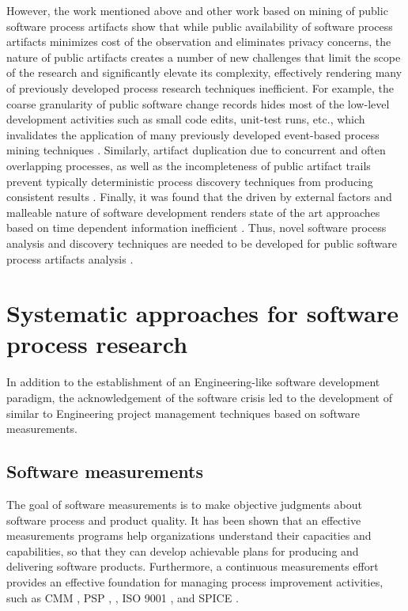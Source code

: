 However, the work mentioned above and other work based on mining of public software process artifacts show 
that while public availability of software process artifacts minimizes cost of the observation and eliminates privacy concerns, 
the nature of public artifacts creates a number of new challenges that limit the scope of the research and 
significantly elevate its complexity, effectively rendering many of previously developed process research techniques inefficient. 
For example, the coarse granularity of public software change records hides most of the low-level development activities
such as small code edits, unit-test runs, etc., which invalidates the application of many previously developed event-based 
process mining techniques \cite{citeulike:10377366} \cite{citeulike:2678511}.
Similarly, artifact duplication due to concurrent and often overlapping processes, as well as the incompleteness of 
public artifact trails prevent typically deterministic process discovery techniques from producing consistent 
results \cite{citeulike:2678511} \cite{citeulike:7770568}. 
Finally, it was found that the driven by external factors and malleable nature of software development renders 
state of the art approaches based on time dependent information inefficient
 \cite{citeulike:10377345} \cite{citeulike:3378725}.
Thus, novel software process analysis and discovery techniques are needed to be 
developed for public software process artifacts analysis \cite{citeulike:7853299}.

%
%
\section{Systematic approaches for software process research}\label{section_software_trajectory}
In addition to the establishment of an Engineering-like software development paradigm, the acknowledgement of 
the software crisis led to the development of similar to Engineering project management techniques based on 
software measurements.

\subsection{Software measurements}
The goal of software measurements is to make objective judgments about software process and product quality. 
It has been shown that an effective measurements programs help organizations understand their capacities and 
capabilities, so that they can develop achievable plans for producing and delivering software products. 
Furthermore, a continuous measurements effort provides an effective foundation for managing process 
improvement activities, 
such as CMM \cite{citeulike:9962021}, 
PSP \cite{citeulike:8347315}, \cite{citeulike:5090131} \cite{citeulike:12929216}, 
ISO 9001 \cite{iso-standard}, and SPICE \cite{spice-standard}.

